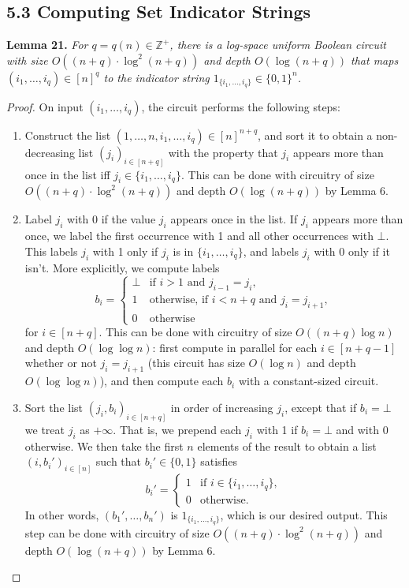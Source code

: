 \documentclass[10pt,a4paper]{article}
\newcommand{\bits}{\{0,1\}}
\newcommand{\ZZ}{\mathbb Z}
\newenvironment{originalresult}[1]{\par\medskip\noindent\textbf{#1.}\itshape}{\par\medskip}
\begin{document}
\subsection*{5.3 Computing Set Indicator Strings}
\begin{originalresult}{Lemma 21}
For $q=q(n)\in\ZZ^+$, there is a log-space uniform Boolean circuit with size $O((n+q)\cdot\log^2(n+q))$ and depth $O(\log(n+q))$ that maps $(i_1,\ldots,i_q)\in[n]^q$ to the indicator string $1_{\{i_1,\ldots,i_q\}}\in\bits^n$.
\end{originalresult}
\begin{proof}
On input $(i_1,\ldots,i_q)$, the circuit performs the following steps:
\begin{enumerate}
\item Construct the list $(1,\ldots,n,i_1,\ldots,i_q)\in[n]^{n+q}$, and sort it to obtain a non-decreasing list $(j_i)_{i\in[n+q]}$ with the property that $j_i$ appears more than once in the list iff $j_i\in\{i_1,\ldots,i_q\}$. This can be done with circuitry of size $O((n+q)\cdot\log^2(n+q))$ and depth $O(\log(n+q))$ by Lemma 6.
\item Label $j_i$ with 0 if the value $j_i$ appears once in the list. If $j_i$ appears more than once, we label the first occurrence with 1 and all other occurrences with $\bot$. This labels $j_i$ with 1 only if $j_i$ is in $\{i_1,\ldots,i_q\}$, and labels $j_i$ with 0 only if it isn't. More explicitly, we compute labels
\[b_i=\begin{cases}\bot&\text{if }i>1\text{ and }j_{i-1}=j_i,\\1&\text{otherwise, if }i<n+q\text{ and }j_i=j_{i+1},\\0&\text{otherwise}\end{cases}\]
for $i\in[n+q]$. This can be done with circuitry of size $O((n+q)\log n)$ and depth $O(\log\log n)$: first compute in parallel for each $i\in[n+q-1]$ whether or not $j_i=j_{i+1}$ (this circuit has size $O(\log n)$ and depth $O(\log\log n)$), and then compute each $b_i$ with a constant-sized circuit.
\item Sort the list $(j_i,b_i)_{i\in[n+q]}$ in order of increasing $j_i$, except that if $b_i=\bot$ we treat $j_i$ as $+\infty$. That is, we prepend each $j_i$ with 1 if $b_i=\bot$ and with 0 otherwise. We then take the first $n$ elements of the result to obtain a list $(i,b_i')_{i\in[n]}$ such that $b_i'\in\{0,1\}$ satisfies
\[b_i'=\begin{cases}1&\text{if }i\in\{i_1,\ldots,i_q\},\\0&\text{otherwise}.\end{cases}\]
In other words, $(b_1',\ldots,b_n')$ is $1_{\{i_1,\ldots,i_q\}}$, which is our desired output. This step can be done with circuitry of size $O((n+q)\cdot\log^2(n+q))$ and depth $O(\log(n+q))$ by Lemma 6.
\end{enumerate}
\end{proof}
\end{document}
